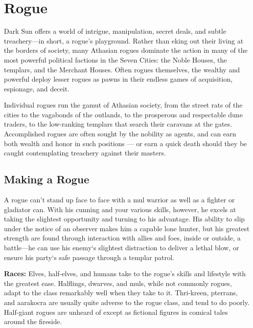\section{Rogue}

Dark Sun offers a world of intrigue, manipulation, secret deals, and subtle treachery—in short, a rogue's playground. Rather than eking out their living at the
borders of society, many Athasian rogues dominate the action in many of the most powerful political factions in the Seven Cities: the Noble Houses, the templars, and the Merchant Houses. Often rogues themselves, the wealthy and powerful deploy lesser rogues as pawns in their endless games of acquisition, espionage, and deceit.

Individual rogues run the gamut of Athasian society, from the street rats of the cities to the vagabonds of the outlands, to the prosperous and respectable dune traders, to the low-ranking templars that search their caravans at the gates. Accomplished rogues are often sought by the nobility as agents, and can earn both wealth and honor in such positions --- or earn a quick death should they be caught contemplating treachery against their masters.



\subsection{Making a Rogue}

A rogue can't stand up face to face with a mul warrior as well as a fighter or gladiator can. With his cunning and your various skills, however, he excels at taking the slightest opportunity and turning to his advantage. His ability to slip under the notice of an observer makes him a capable lone hunter, but his greatest strength are found through interaction with allies and foes, inside or outside, a battle—he can use his enemy`s slightest distraction to deliver a lethal blow, or ensure his party`s safe passage through a templar patrol.

\textbf{Races:} Elves, half-elves, and humans take to the rogue's skills and lifestyle with the greatest ease. Halflings, dwarves, and muls, while not commonly rogues, adapt to the class remarkably well when they take to it. Thri-kreen, pterrans, and aarakocra are usually quite adverse to the rogue class, and tend to do poorly. Half-giant rogues are unheard of except as fictional figures in comical tales around the fireside.

